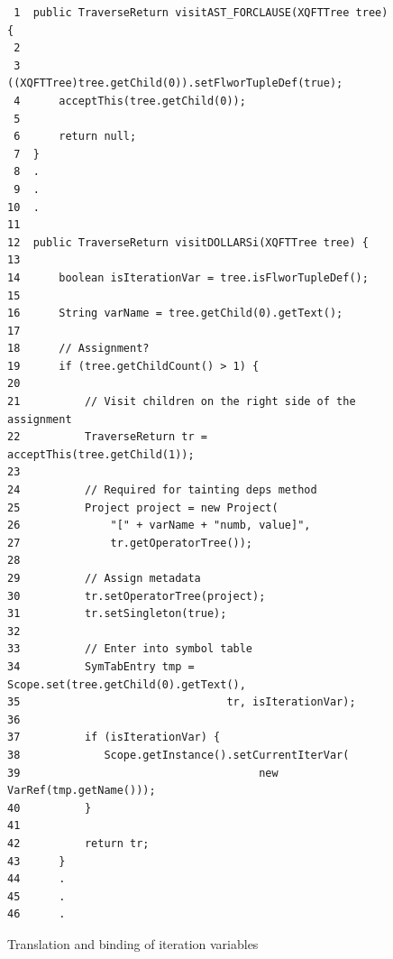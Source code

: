 \begin{figure}[!htp]
\begin{center}
\begin{Verbatim}
 1  public TraverseReturn visitAST_FORCLAUSE(XQFTTree tree) {
 2     
 3      ((XQFTTree)tree.getChild(0)).setFlworTupleDef(true);
 4      acceptThis(tree.getChild(0));
 5
 6      return null;
 7  }
 8  .
 9  .
10  .
11    
12  public TraverseReturn visitDOLLARSi(XQFTTree tree) {
13        
14      boolean isIterationVar = tree.isFlworTupleDef();
15        
16      String varName = tree.getChild(0).getText();
17        
18      // Assignment?
19      if (tree.getChildCount() > 1) {
20           
21          // Visit children on the right side of the assignment
22          TraverseReturn tr = acceptThis(tree.getChild(1));
23            
24          // Required for tainting deps method
25          Project project = new Project(
26              "[" + varName + "numb, value]", 
27              tr.getOperatorTree());
28
29          // Assign metadata
30          tr.setOperatorTree(project);
31          tr.setSingleton(true);
32            
33          // Enter into symbol table
34          SymTabEntry tmp = Scope.set(tree.getChild(0).getText(), 
35                                tr, isIterationVar);
36            
37          if (isIterationVar) {
38             Scope.getInstance().setCurrentIterVar(
39                                     new VarRef(tmp.getName()));
40          }
41            
42          return tr;
43      }
44      .
45      .
46      .
\end{Verbatim}
  \caption{Translation and binding of iteration variables}
  \label{fig:impl:td:varbindfor}
\end{center}
\end{figure}


